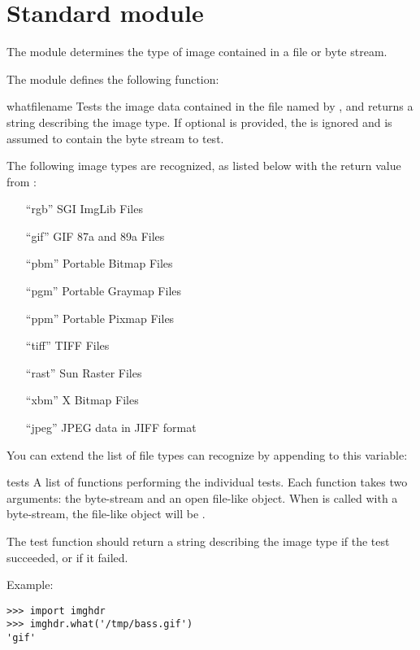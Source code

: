 \section{Standard module }
\label{module-imghdr}

The  module determines the type of image contained in a
file or byte stream.

The  module defines the following function:

\renewcommand{\indexsubitem}{(in module imghdr)}

\begin{funcdesc}{what}{filename}
Tests the image data contained in the file named by ,
and returns a string describing the image type.  If optional 
is provided, the  is ignored and  is assumed to
contain the byte stream to test.
\end{funcdesc}

The following image types are recognized, as listed below with the
return value from :

\begin{enumerate}
\item[``rgb''] SGI ImgLib Files

\item[``gif''] GIF 87a and 89a Files

\item[``pbm''] Portable Bitmap Files

\item[``pgm''] Portable Graymap Files

\item[``ppm''] Portable Pixmap Files

\item[``tiff''] TIFF Files

\item[``rast''] Sun Raster Files

\item[``xbm''] X Bitmap Files

\item[``jpeg''] JPEG data in JIFF format
\end{enumerate}

You can extend the list of file types  can recognize by
appending to this variable:

\begin{datadesc}{tests}
A list of functions performing the individual tests.  Each function
takes two arguments: the byte-stream and an open file-like object.
When  is called with a byte-stream, the file-like
object will be .

The test function should return a string describing the image type if
the test succeeded, or  if it failed.
\end{datadesc}

Example:

\bcode\begin{verbatim}
>>> import imghdr
>>> imghdr.what('/tmp/bass.gif')
'gif'
\end{verbatim}\ecode
